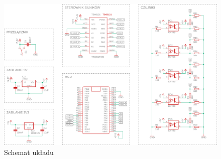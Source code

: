 \documentclass[10pt, a4paper]{article}
\begin{document}
\begin{figure}[H]
	\centering
	\includegraphics[width=1.4\textwidth, angle = 90]{schemat.png}
	\caption{Schemat układu}
	\label{fig:Schemat}
\end{figure}
\end{document}
